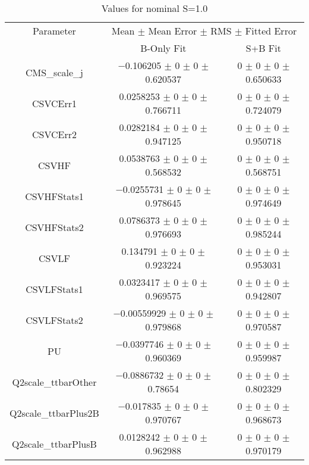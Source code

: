 \begin{table}
\centering
\caption{Values for nominal S=1.0}
\begin{tabular}{ccc}
\toprule
Parameter & \multicolumn{2}{c}{Mean $\pm$ Mean Error $\pm$ RMS $\pm$ Fitted Error}\\
 & B-Only Fit & S+B Fit\\
\midrule
CMS\_scale\_j & \num{-0.106205} $\pm$ \num{0} $\pm$ \num{0} $\pm$ \num{0.620537} & \num{0} $\pm$ \num{0} $\pm$ \num{0} $\pm$ \num{0.650633}\\
CSVCErr1 & \num{0.0258253} $\pm$ \num{0} $\pm$ \num{0} $\pm$ \num{0.766711} & \num{0} $\pm$ \num{0} $\pm$ \num{0} $\pm$ \num{0.724079}\\
CSVCErr2 & \num{0.0282184} $\pm$ \num{0} $\pm$ \num{0} $\pm$ \num{0.947125} & \num{0} $\pm$ \num{0} $\pm$ \num{0} $\pm$ \num{0.950718}\\
CSVHF & \num{0.0538763} $\pm$ \num{0} $\pm$ \num{0} $\pm$ \num{0.568532} & \num{0} $\pm$ \num{0} $\pm$ \num{0} $\pm$ \num{0.568751}\\
CSVHFStats1 & \num{-0.0255731} $\pm$ \num{0} $\pm$ \num{0} $\pm$ \num{0.978645} & \num{0} $\pm$ \num{0} $\pm$ \num{0} $\pm$ \num{0.974649}\\
CSVHFStats2 & \num{0.0786373} $\pm$ \num{0} $\pm$ \num{0} $\pm$ \num{0.976693} & \num{0} $\pm$ \num{0} $\pm$ \num{0} $\pm$ \num{0.985244}\\
CSVLF & \num{0.134791} $\pm$ \num{0} $\pm$ \num{0} $\pm$ \num{0.923224} & \num{0} $\pm$ \num{0} $\pm$ \num{0} $\pm$ \num{0.953031}\\
CSVLFStats1 & \num{0.0323417} $\pm$ \num{0} $\pm$ \num{0} $\pm$ \num{0.969575} & \num{0} $\pm$ \num{0} $\pm$ \num{0} $\pm$ \num{0.942807}\\
CSVLFStats2 & \num{-0.00559929} $\pm$ \num{0} $\pm$ \num{0} $\pm$ \num{0.979868} & \num{0} $\pm$ \num{0} $\pm$ \num{0} $\pm$ \num{0.970587}\\
PU & \num{-0.0397746} $\pm$ \num{0} $\pm$ \num{0} $\pm$ \num{0.960369} & \num{0} $\pm$ \num{0} $\pm$ \num{0} $\pm$ \num{0.959987}\\
Q2scale\_ttbarOther & \num{-0.0886732} $\pm$ \num{0} $\pm$ \num{0} $\pm$ \num{0.78654} & \num{0} $\pm$ \num{0} $\pm$ \num{0} $\pm$ \num{0.802329}\\
Q2scale\_ttbarPlus2B & \num{-0.017835} $\pm$ \num{0} $\pm$ \num{0} $\pm$ \num{0.970767} & \num{0} $\pm$ \num{0} $\pm$ \num{0} $\pm$ \num{0.968673}\\
Q2scale\_ttbarPlusB & \num{0.0128242} $\pm$ \num{0} $\pm$ \num{0} $\pm$ \num{0.962988} & \num{0} $\pm$ \num{0} $\pm$ \num{0} $\pm$ \num{0.970179}\\

\end{tabular}
\end{table}
